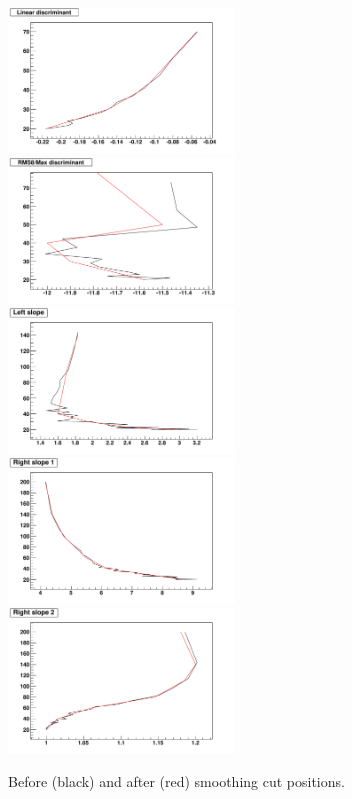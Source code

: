\begin{figure}[htbp]
   \includegraphics[width=60mm]{DailyLog/6371/6371_CutPosition_Linear}
   \includegraphics[width=60mm]{DailyLog/6371/6371_CutPosition_Spike}
   \includegraphics[width=60mm]{DailyLog/6371/6371_CutPosition_LeftSlope}
   \includegraphics[width=60mm]{DailyLog/6371/6371_CutPosition_RightSlope1}
   \includegraphics[width=60mm]{DailyLog/6371/6371_CutPosition_RightSlope2}
   \caption{Before (black) and after (red) smoothing cut positions.}
   \label{Figure_6371_SmoothedCutPositions}
\end{figure}

